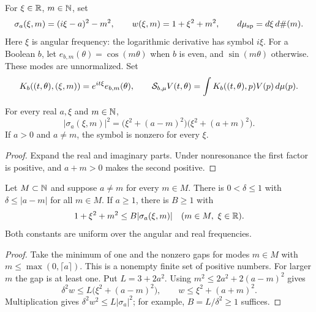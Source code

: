 \begin{definition}
\label{def:cylinder-spectral-data}
\leanok
For $\xi\in\mathbb{R}$, $m\in\mathbb{N}$, set
\[
 \sigma_a(\xi,m)=(i\xi-a)^2-m^2,\qquad
 w(\xi,m)=1+\xi^2+m^2,\qquad d\mu_{\rm sp}=d\xi\,d\#(m).
\]
Here $\xi$ is angular frequency: the logarithmic derivative has symbol $i\xi$.
For a Boolean $b$, let $e_{b,m}(\theta)=\cos(m\theta)$ when $b$ is even,
and $\sin(m\theta)$ otherwise. These modes are unnormalized.
Set
\[
 K_b((t,\theta),(\xi,m))=e^{it\xi}e_{b,m}(\theta),\qquad
 {\cal S}_{b,\mu}V(t,\theta)=\int K_b((t,\theta),p)V(p)\,d\mu(p).
\]
\end{definition}

\begin{lemma}
\label{lem:cylinder-symbol-factorization}
\leanok
For every real $a,\xi$ and $m\in\mathbb{N}$,
\[
 |\sigma_a(\xi,m)|^2=
  \bigl(\xi^2+(a-m)^2\bigr)\bigl(\xi^2+(a+m)^2\bigr).
\]
If $a>0$ and $a\ne m$, the symbol is nonzero for every $\xi$.
\end{lemma}

\begin{proof}
\leanok
Expand the real and imaginary parts. Under nonresonance the first factor is
positive, and $a+m>0$ makes the second positive.
\end{proof}

\begin{lemma}
\label{lem:cylinder-symbol-gap}
\leanok
Let $M\subset\mathbb{N}$ and suppose $a\ne m$ for every $m\in M$.
There is $0<\delta\le1$ with $\delta\le|a-m|$ for all $m\in M$.
If $a\ge1$, there is $B\ge1$ with
\[
 1+\xi^2+m^2\le B|\sigma_a(\xi,m)|
 \quad(m\in M,\ \xi\in\mathbb{R}).
\]
Both constants are uniform over the angular and real frequencies.
\end{lemma}

\begin{proof}
\leanok
Take the minimum of one and the nonzero gaps for modes $m\in M$ with
$m\le\max(0,\lceil a\rceil)$. This is a nonempty finite set of positive numbers.
For larger $m$ the gap is at least one.
Put $L=3+2a^2$. Using
$m^2\le2a^2+2(a-m)^2$ gives
\[
 \delta^2w\le L\bigl(\xi^2+(a-m)^2\bigr),\qquad
 w\le \xi^2+(a+m)^2.
\]
Multiplication gives $\delta^2w^2\le L|\sigma_a|^2$; for example,
$B=L/\delta^2\ge1$ suffices.
\end{proof}

